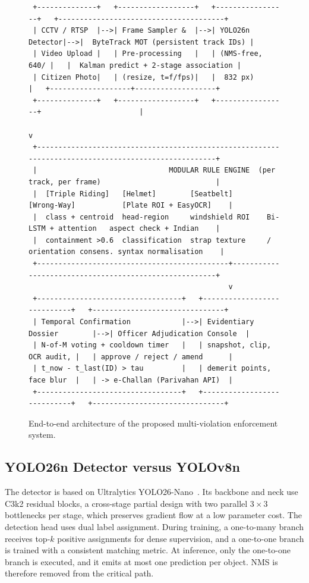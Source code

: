 \documentclass[conference]{IEEEtran}
\begin{document}
\begin{figure}[!t]
\centering
\footnotesize
\begin{verbatim}
 +--------------+   +------------------+   +-----------------+   +---------------------------------------+
 | CCTV / RTSP  |-->| Frame Sampler &  |-->| YOLO26n Detector|-->|  ByteTrack MOT (persistent track IDs) |
 | Video Upload |   | Pre-processing   |   | (NMS-free, 640/ |   |  Kalman predict + 2-stage association |
 | Citizen Photo|   | (resize, t=f/fps)|   |  832 px)        |   +-------------------+-------------------+
 +--------------+   +------------------+   +-----------------+                       |
                                                                                     v
 +-----------------------------------------------------------------------------------------------------+
 |                               MODULAR RULE ENGINE  (per track, per frame)                           |
 |  [Triple Riding]   [Helmet]        [Seatbelt]        [Wrong-Way]           [Plate ROI + EasyOCR]    |
 |  class + centroid  head-region     windshield ROI    Bi-LSTM + attention   aspect check + Indian    |
 |  containment >0.6  classification  strap texture     / orientation consens. syntax normalisation    |
 +---------------------------------------------+-------------------------------------------------------+
                                               v
 +----------------------------------+   +----------------------------+   +-------------------------------+
 | Temporal Confirmation            |-->| Evidentiary Dossier        |-->| Officer Adjudication Console  |
 | N-of-M voting + cooldown timer   |   | snapshot, clip, OCR audit, |   | approve / reject / amend      |
 | t_now - t_last(ID) > tau         |   | demerit points, face blur  |   | -> e-Challan (Parivahan API)  |
 +----------------------------------+   +----------------------------+   +-------------------------------+
\end{verbatim}
\caption{End-to-end architecture of the proposed multi-violation enforcement system.}
\label{fig:arch}
\end{figure}

\subsection{YOLO26n Detector versus YOLOv8n}
The detector is based on Ultralytics YOLO26-Nano~\cite{ultralytics2025yolo26}. Its backbone and neck use C3k2 residual blocks, a cross-stage partial design with two parallel $3{\times}3$ bottlenecks per stage, which preserves gradient flow at a low parameter cost. The detection head uses dual label assignment. During training, a one-to-many branch receives top-$k$ positive assignments for dense supervision, and a one-to-one branch is trained with a consistent matching metric. At inference, only the one-to-one branch is executed, and it emits at most one prediction per object. NMS is therefore removed from the critical path.
\end{document}
